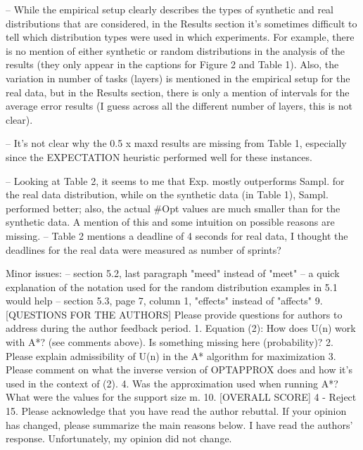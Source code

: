 -- While the empirical setup clearly describes the types of synthetic and real distributions that are considered, in the Results section it's sometimes difficult to tell which distribution types were used in which experiments. For example, there is no mention of either synthetic or random distributions in the analysis of the results (they only appear in the captions for Figure 2 and Table 1). Also, the variation in number of tasks (layers) is mentioned in the empirical setup for the real data, but in the Results section, there is only a mention of intervals for the average error results (I guess across all the different number of layers, this is not clear).

-- It's not clear why the 0.5 x maxd results are missing from Table 1, especially since the EXPECTATION heuristic performed well for these instances.

-- Looking at Table 2, it seems to me that Exp. mostly outperforms Sampl. for the real data distribution, while on the synthetic data (in Table 1), Sampl. performed better; also, the actual #Opt values are much smaller than for the synthetic data. A mention of this and some intuition on possible reasons are missing.
-- Table 2 mentions a deadline of 4 seconds for real data, I thought the deadlines for the real data were measured as number of sprints?

Minor issues:
-- section 5.2, last paragraph "meed" instead of "meet"
-- a quick explanation of the notation used for the random distribution examples in 5.1 would help
-- section 5.3, page 7, column 1, "effects" instead of "affects"
9. [QUESTIONS FOR THE AUTHORS] Please provide questions for authors to address during the author feedback period.
1. Equation (2): How does U(n) work with A*? (see comments above). Is something missing here (probability)?
2. Please explain admissibility of U(n) in the A* algorithm for maximization
3. Please comment on what the inverse version of OPTAPPROX does and how it's used in the context of (2).
4. Was the approximation used when running A*? What were the values for the support size m.
10. [OVERALL SCORE]
4 - Reject
15. Please acknowledge that you have read the author rebuttal. If your opinion has changed, please summarize the main reasons below.
I have read the authors' response. Unfortunately, my opinion did not change.


